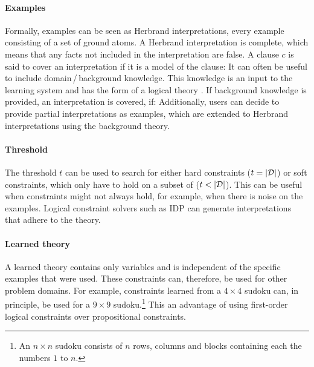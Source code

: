 \paragraph{Examples}
Formally, examples can be seen as Herbrand interpretations, every example consisting of a set of ground atoms.
A Herbrand interpretation is complete, which means that any facts not included in the interpretation are false.
A clause $c$ is said to cover an interpretation  if it is a model of the clause: 
It can often be useful to include domain\,/\,background knowledge.
This knowledge is an input to the learning system and has the form of a logical theory .
If background knowledge is provided, an interpretation  is covered, if: 
Additionally, users can decide to provide partial interpretations as examples, which are extended to Herbrand interpretations using the background theory.

\paragraph{Threshold}
The threshold $t$ can be used to search for either hard constraints ($t = |\mathcal{D}|$) or soft constraints, which only have to hold on a subset of  ($t < |\mathcal{D}|$).
This can be useful when constraints might not always hold, for example, when there is noise on the examples.
Logical constraint solvers such as IDP can generate interpretations that adhere to the theory.

\paragraph{Learned theory}
A learned theory  contains only variables and is independent of the specific examples that were used.
These constraints can, therefore, be used for other problem domains.
For example, constraints learned from a $4 \times 4$ sudoku can, in principle, be used for a $9 \times 9$ sudoku.\footnote{An $n \times n$ sudoku consists of $n$ rows, columns and blocks containing each the numbers $1$ to $n$.}
This an advantage of using first-order logical constraints over propositional constraints.


